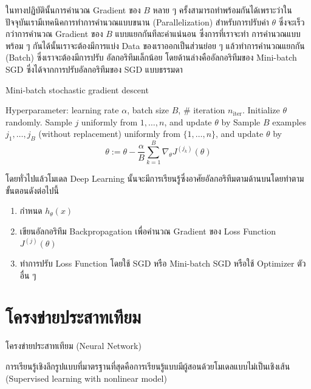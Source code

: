 ในทางปฏิบัตินั้นการคำนวณ Gradient ของ $B$ หลาย ๆ ครั้งสามารถทำพร้อมกันได้เพราะว่าในปัจจุบันเรามีเทคนิคการทำการคำนวณแบบขนาน 
(Parallelization) สำหรับการปรับค่า $\theta$ ซึ่งจะเร็วกว่าการคำนวณ Gradient ของ $B$ แบบแยกกันทีละค่าแน่นอน ซึ่งการที่เราจะทำ%
การคำนวณแบบพร้อม ๆ กันได้นั้นเราจะต้องมีการแบ่ง Data ของเราออกเป็นส่วนย่อย ๆ แล้วทำการคำนวณแยกกัน (Batch) ซึ่งเราจะต้องมีการปรับ%
อัลกอริทึมเล็กน้อย โดยด้านล่างคืออัลกอริทึมของ Mini-batch SGD ซึ่งได้จากการปรับอัลกอริทึมของ SGD แบบธรรมดา  

\begin{algorithm}[ht]
    \caption{Mini-batch stochastic gradient descent}
    \label{alg:sgd_minibatch}
    \begin{algorithmic}
    \State Hyperparameter: learning rate $\alpha$, batch size $B$, \# iteration $n_\text{iter}$.
    \State Initialize $\theta$ randomly.
        \State Sample $j$ uniformly from ${1,\ldots,n}$, and update $\theta$ by
        \State Sample $B$ examples $j_1,\ldots,j_B$ (without replacement) uniformly from $\{1,\ldots,n\}$, 
        and update $\theta$ by
        \begin{equation*}
            \theta := \theta - \frac{\alpha}{B}\sum_{k=1}^B\nabla_\theta J^{(j_k)}(\theta)
        \end{equation*}
    \EndFor
    \end{algorithmic}
\end{algorithm}

โดยทั่วไปแล้วโมเดล Deep Learning นั้นจะมีการเรียนรู้ซึ่งอาศัยอัลกอริทึมตามด้านบนโดยทำตามขั้นตอนดังต่อไปนี้

\begin{enumerate}
    \item กำหนด $h_\theta(x)$
    \item เขียนอัลกอริทึม Backpropagation เพื่อคำนวณ Gradient ของ Loss Function $J^{(j)}(\theta)$
    \item ทำการปรับ Loss Function โดยใช้ SGD หรือ Mini-batch SGD หรือใช้ Optimizer ตัวอื่น ๆ
\end{enumerate}

\section{โครงข่ายประสาทเทียม}
\label{sec:nn}

โครงข่ายประสาทเทียม (Neural Network)

การเรียนรู้เชิงลึกรูปแบบที่มาตรฐานที่สุดคือการเรียนรู้แบบมีผู้สอนด้วยโมเดลแบบไม่เป็นเชิงเส้น (Supervised learning with nonlinear model)


